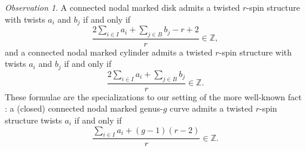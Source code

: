 \documentclass[11pt]{amsart}
\theoremstyle{definition}
\theoremstyle{remark}
\newtheorem{obs}[dummy]{Observation}
\newcommand{\<}{\left<}
\renewcommand{\>}{\right>}
\numberwithin{equation}{section}
\begin{document}
\begin{obs}
\label{obs rank open}
A connected nodal marked disk admits a twisted $r$-spin structure with twists $a_i$ and $b_j$ if and only if
\begin{equation}\label{eq mod r condition g=0}
\frac{2\sum_{i \in I} a_i + \sum_{j\in B} b_j -r+2}{r}\in \mathbb Z,
\end{equation}
and a connected nodal marked cylinder admits a twisted $r$-spin structure with twists $a_i$ and $b_j$ if and only if
\begin{equation}\label{eq mod r condition rk g=1}
\frac{2\sum_{i \in I} a_i + \sum_{j\in B} b_j}{r}\in \mathbb Z.
\end{equation}
These formulae are the specializations to our setting of the more well-known fact \cite{Witten93}: a (closed) connected nodal marked genus-$g$ curve admits a twisted $r$-spin structure twists $a_i$ if and only if 
\begin{equation}\label{eq rank close}
\frac{\sum_{i\in I} a_i +(g-1)(r-2)}{r}\in {\mathbb{Z}}.
\end{equation}
\end{obs}
\end{document}
